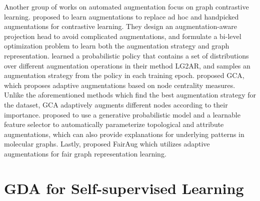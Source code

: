 \documentclass[11pt]{article}
\begin{document}
Another group of works on automated augmentation focus on graph contrastive learning. \citet{you2021graph} proposed to learn augmentations to replace ad hoc and handpicked augmentations for contrastive learning. They design an augmentation-aware projection head to avoid complicated augmentations, and formulate a bi-level optimization problem to learn both the augmentation strategy and graph representation. \citet{hassani2022learning} learned a probabilistic policy that contains a set of distributions over different augmentation operations in their method LG2AR, and samples an augmentation strategy from the policy in each training epoch. 
\citet{zhu2021graph} proposed GCA, which proposes adaptive augmentations based on node centrality measures. Unlike the aforementioned methods which find the best augmentation strategy for the dataset, GCA adaptively augments different nodes according to their importance. \citet{wang2021molecular} proposed to use a generative probabilistic model and a learnable feature selector to automatically parameterize topological and attribute augmentations, which can also provide explanations for underlying patterns in molecular graphs. Lastly, \citet{kose2022fair} proposed FairAug which utilizes adaptive augmentations for fair graph representation learning.



\section{GDA for Self-supervised Learning}
\label{sec:application}
\end{document}
